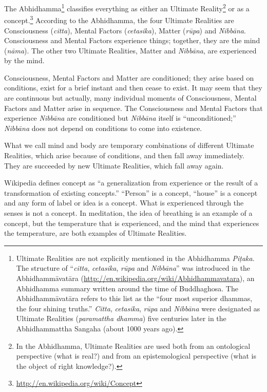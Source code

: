 The Abhidhamma\footnote{Ultimate Realities are not explicitly mentioned in the Abhidhamma \textit{Piṭaka}. The structure of “\textit{citta}, \textit{cetasika}, \textit{rūpa} and \textit{Nibbāna}” was introduced in the Abhidhammāvatāra (\url{http://en.wikipedia.org/wiki/Abhidhammavatara}), an Abhidhamma summary written around the time of Buddhaghosa. The Abhidhammāvatāra refers to this list as the “four most superior dhammas, the four shining truths.” \textit{Citta}, \textit{cetasika}, \textit{rūpa} and \textit{Nibbāna} were designated as Ultimate Realities (\textit{paramattha dhamma}) five centuries later in the Abhidhammattha Sangaha (about 1000 years ago).} classifies everything as either an Ultimate Reality\footnote{In the Abhidhamma, Ultimate Realities are used both from an ontological perspective (what is real?) and from an epistemological perspective (what is the object of right knowledge?).} or as a concept.\footnote{\url{http://en.wikipedia.org/wiki/Concept}} According to the Abhidhamma, the four Ultimate Realities are Consciousness (\textit{citta}), Mental Factors (\textit{cetasika}), Matter (\textit{rūpa}) and \textit{Nibbāna}. Consciousness and Mental Factors experience things; together, they are the mind (\textit{nāma}). The other two Ultimate Realities, Matter and \textit{Nibbāna}, are experienced by the mind. 

Consciousness, Mental Factors and Matter are conditioned; they arise based on conditions, exist for a brief instant and then cease to exist. It may seem that they are continuous but actually, many individual moments of Consciousness, Mental Factors and Matter arise in sequence. The Consciousness and Mental Factors that experience \textit{Nibbāna} are conditioned but \textit{Nibbāna} itself is “unconditioned;” \textit{Nibbāna} does not depend on conditions to come into existence.

\color{red}

What we call mind and body are temporary combinations of different Ultimate Realities, which arise because of conditions, and then fall away immediately. They are succeeded by new Ultimate Realities, which fall away again.

\color{black}

Wikipedia defines concept as “a generalization from experience or the result of a transformation of existing concepts.” “Person” is a concept, “house” is a concept and any form of label or idea is a concept. What is experienced through the senses is not a concept. In meditation, the idea of breathing is an example of a concept, but the temperature that is experienced, and the mind that experiences the temperature, are both examples of Ultimate Realities.

